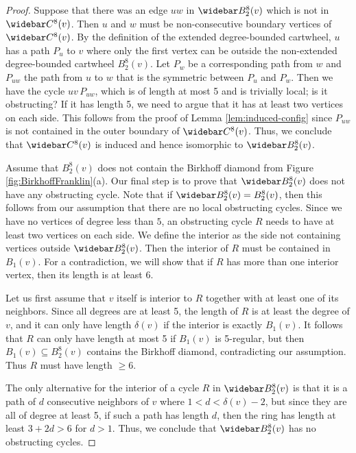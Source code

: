 \documentclass[10pt,a4paper]{article}
\renewcommand{\bar}{\widebar}
\begin{document}
\begin{proof}
  Suppose that there was an edge $uw$ in $\bar B_2^8(v)$ which is not in
  $\bar C^8(v)$. Then $u$ and $w$ must be non-consecutive boundary vertices of 
  $\bar C^8(v)$. By the definition of the
  extended degree-bounded cartwheel, $u$ has a path $P_u$ to $v$ where only the first vertex can be outside the non-extended degree-bounded cartwheel $B_2^8(v)$. Let $P_w$ be a corresponding path from $w$ and $P_{uw}$ the path from $u$ to $w$ that is the symmetric between
  $P_u$ and $P_w$. Then we have the cycle $uv\, P_{uw}$, which is of length at most 5 and is trivially local; is it obstructing?
  If it has length 5, we need to argue that it has at least two
  vertices on each side. This follows
  from the proof of Lemma \ref{lem:induced-config} since $P_{uw}$ is not contained in the outer boundary of $\bar C^8(v)$. Thus, we conclude that $\bar C^8(v)$ is induced and hence isomorphic to   $\bar B_2^8(v)$.

  Assume that $B_2^8(v)$ does not contain
  the Birkhoff diamond from Figure \ref{fig:BirkhoffFranklin}(a).  Our final step is to prove that
  $\bar B_2^8(v)$ 
  does not have any
  obstructing cycle. Note that if $\bar B^8_2(v)=B^8_2(v)$, then this follows from
  our assumption that there are no local obstructing cycles. Since we have no vertices of degree less than $5$, an obstructing cycle $R$ needs to have at least two vertices on each side. We define the interior as the side not containing vertices outside $\bar B_2^8(v)$. 
  Then the interior of $R$ must be contained in  $B_1(v)$.   
  For a contradiction, we
  will show that if $R$ has more than one interior vertex, then its length is at least $6$.

  Let us first assume that $v$ itself is interior to $R$ together with at least one of
  its neighbors. Since all degrees are at least 5, the length of $R$ is at least the degree of $v$, and it can only have length $\delta(v)$ if 
  the interior is exactly $B_1(v)$. It follows that $R$ can only have length at most 5
  if $B_1(v)$ is 5-regular, but then
  $B_1(v)\subseteq B_2^8(v)$ contains the Birkhoff diamond, contradicting our assumption. Thus $R$ must have length $\geq 6$.

  The only alternative for the interior of a cycle $R$ in   $\bar B_2^8(v)$ is that it 
  is a path of $d$ consecutive neighbors of $v$ where $1<d<\delta(v)-2$, but
  since they are all of degree at least 5, if such a path has 
  length $d$, then the ring has length at least $3+2d>6$ for $d>1$.
  Thus, we conclude that $\bar B_2^8(v)$ has no obstructing cycles.
\end{proof}
\end{document}
